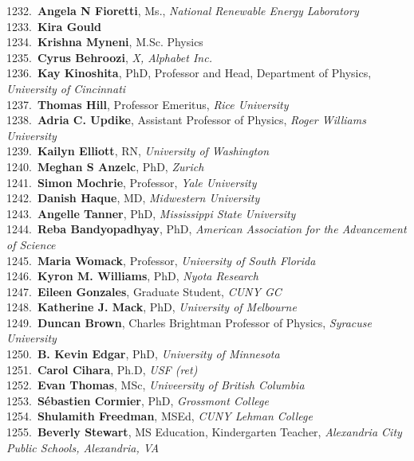 1232.~{\bf Angela N Fioretti}, Ms., {\sl National Renewable Energy Laboratory} \\
1233.~{\bf Kira Gould} \\
1234.~{\bf Krishna Myneni}, M.Sc. Physics \\
1235.~{\bf Cyrus Behroozi}, {\sl X, Alphabet Inc.} \\
1236.~{\bf Kay Kinoshita}, PhD, Professor and Head, Department of Physics, {\sl University of Cincinnati} \\
1237.~{\bf Thomas Hill}, Professor Emeritus, {\sl Rice University} \\
1238.~{\bf Adria C. Updike}, Assistant Professor of Physics, {\sl Roger Williams University} \\
1239.~{\bf Kailyn Elliott}, RN, {\sl University of Washington } \\
1240.~{\bf Meghan S Anzelc}, PhD, {\sl Zurich} \\
1241.~{\bf Simon Mochrie}, Professor, {\sl Yale University} \\
1242.~{\bf Danish Haque}, MD, {\sl Midwestern University} \\
1243.~{\bf Angelle Tanner}, PhD, {\sl Mississippi State University} \\
1244.~{\bf Reba Bandyopadhyay}, PhD, {\sl American Association for the Advancement of Science} \\
1245.~{\bf Maria Womack}, Professor, {\sl University of South Florida} \\
1246.~{\bf Kyron M. Williams}, PhD, {\sl Nyota Research} \\
1247.~{\bf Eileen Gonzales}, Graduate Student, {\sl CUNY GC} \\
1248.~{\bf Katherine J. Mack}, PhD, {\sl University of Melbourne} \\
1249.~{\bf Duncan Brown}, Charles Brightman Professor of Physics, {\sl Syracuse University} \\
1250.~{\bf B. Kevin Edgar}, PhD, {\sl University of Minnesota} \\
1251.~{\bf Carol Cihara}, Ph.D, {\sl USF (ret)} \\
1252.~{\bf Evan Thomas}, MSc, {\sl Univeersity of British Columbia} \\
1253.~{\bf S\'{e}bastien Cormier}, PhD, {\sl Grossmont College} \\
1254.~{\bf Shulamith Freedman}, MSEd, {\sl CUNY Lehman College} \\
1255.~{\bf Beverly Stewart}, MS Education, Kindergarten Teacher, {\sl Alexandria City Public Schools, Alexandria, VA} \\
